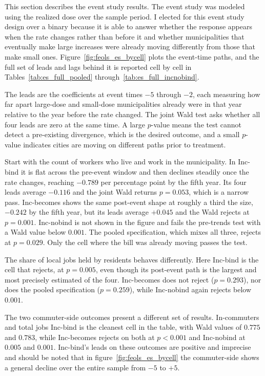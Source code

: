 \documentclass[12pt]{article}
\begin{document}
This section describes the event study results. The event study was modeled using the realized dose over the sample period. I elected for this event study design over a binary because it is able to answer whether the response
appears when the rate changes rather than before it and whether
municipalities that eventually make large increases were already moving
differently from those that make small ones.
Figure~\ref{fig:feols_es_bycell} plots the event-time paths, and the full
set of leads and lags behind it is reported cell by cell in
Tables~\ref{tab:es_full_pooled} through~\ref{tab:es_full_incnobind}.

The leads are the coefficients at event
times $-5$ through $-2$, each measuring how far apart large-dose and
small-dose municipalities already were in that year relative to the year
before the rate changed. The joint Wald test asks whether all four leads
are zero at the same time. A large $p$-value means the test cannot detect
a pre-existing divergence, which is the desired outcome, and a small $p$-value indicates cities are moving on different paths prior to treatment.



Start with the count of workers who live and work in the municipality. In Inc-bind it is flat across the
pre-event window and then declines steadily once the rate changes,
reaching $-0.789$ per percentage point by the fifth year. Its four leads
average $-0.116$ and the joint Wald returns $p = 0.053$, which is a narrow pass. Inc-becomes shows the same post-event shape at roughly a
third the size, $-0.242$ by the fifth year, but its leads average $+0.045$
and the Wald rejects at $p = 0.001$. Inc-nobind is not shown in the figure and fails the pre-trends test with a Wald value below $0.001$. The pooled specification, which mixes all three,
rejects at $p = 0.029$. Only the cell where the bill was already moving
passes the test.

The share of local jobs held by residents behaves differently. Here Inc-bind is the cell that rejects, at
$p = 0.005$, even though its post-event path is the largest and most
precisely estimated of the four. Inc-becomes does not reject
($p = 0.293$), nor does the pooled specification ($p = 0.259$), while
Inc-nobind again rejects below $0.001$.

The two commuter-side outcomes present a different set of results. In-commuters and total jobs Inc-bind is the cleanest cell in the table,
with Wald values of $0.775$ and $0.783$, while Inc-becomes rejects on both
at $p < 0.001$ and Inc-nobind at $0.005$ and $0.001$. Inc-bind's leads on
these outcomes are positive and imprecise and should be noted that in figure~\ref{fig:feols_es_bycell} the commuter-side shows a general decline over the entire sample from $-5$ to $+5$.
\end{document}
